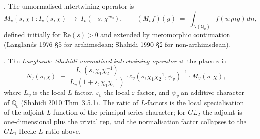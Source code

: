 \begin{definition}
\label{v4-arith:w6-d:def:M-unnormalised}
\ClaimStatusDefinitional. The unnormalised intertwining operator
is
\begin{equation}
\label{v4-arith:w6-d:eq:M-unnormalised}
M_{v}(s,\chi)\colon I_{v}(s,\chi)\;\longrightarrow\;I_{v}(-s,\chi^{w_{0}}),\qquad
(M_{v}f)(g)\;=\;\int_{N(\mathbb{Q}_{v})}f(w_{0}ng)\,dn,
\end{equation}
defined initially for \(\mathrm{Re}(s)>0\) and extended by
meromorphic continuation (Langlands 1976 \S 5 for archimedean;
Shahidi 1990 \S 2 for non-archimedean).
\end{definition}

\begin{definition}
\label{v4-arith:w6-d:def:N-normalised}
\ClaimStatusDefinitional. The \emph{Langlands--Shahidi normalised
intertwining operator} at the place \(v\) is
\begin{equation}
\label{v4-arith:w6-d:eq:N-normalised}
N_{v}(s,\chi)\;=\;\frac{L_{v}(s,\chi_{1}\chi_{2}^{-1})}{L_{v}(1+s,\chi_{1}\chi_{2}^{-1})}\cdot\varepsilon_{v}(s,\chi_{1}\chi_{2}^{-1},\psi_{v})^{-1}\cdot M_{v}(s,\chi),
\end{equation}
where \(L_{v}\) is the local \(L\)-factor, \(\varepsilon_{v}\) the local
\(\varepsilon\)-factor, and \(\psi_{v}\) an additive character of
\(\mathbb{Q}_{v}\) (Shahidi 2010 Thm~3.5.1). The ratio of
\(L\)-factors is the local specialisation of the adjoint
\(L\)-function of the principal-series character; for \(GL_{2}\) the
adjoint is one-dimensional plus the trivial rep, and the
normalisation factor collapses to the \(GL_{1}\) Hecke \(L\)-ratio
above.
\end{definition}

